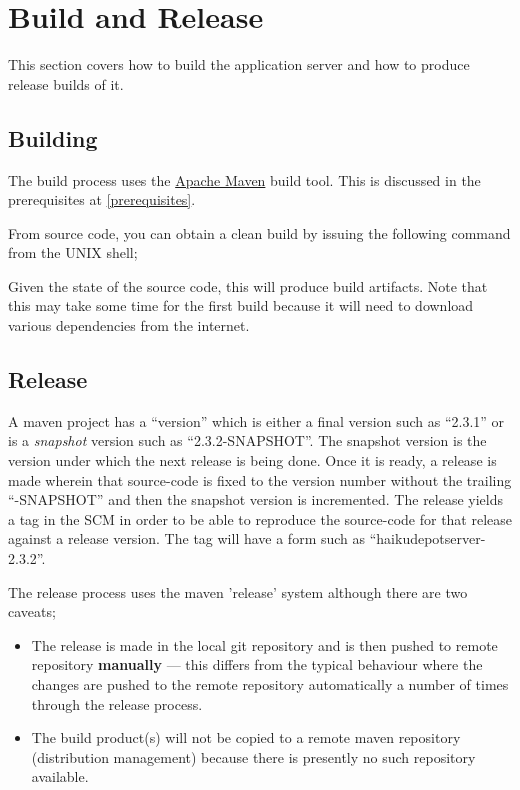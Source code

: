 
\section{Build and Release}
\label{buildandrelease}

This section covers how to build the application server and how to produce release builds of it.

\subsection{Building}

The build process uses the \href{http://maven.apache.org}{Apache Maven} build tool.  This is discussed in the prerequisites at \ref{prerequisites}.

From source code, you can obtain a clean build by issuing the following command from the UNIX shell;


Given the state of the source code, this will produce build artifacts.  Note that this may take some time for the first build because it will need to download various dependencies from the internet.

\subsection{Release}

A maven project has a ``version'' which is either a final version such as ``2.3.1'' or is a {\it snapshot} version such as ``2.3.2-SNAPSHOT''.  The snapshot version is the version under which the next release is being done.  Once it is ready, a release is made wherein that source-code is fixed to the version number without the trailing ``-SNAPSHOT'' and then the snapshot version is incremented.  The release yields a tag in the SCM in order to be able to reproduce the source-code for that release against a release version.  The tag will have a form such as ``haikudepotserver-2.3.2''.

 The release process uses the maven 'release' system although there are two caveats;

 \begin{itemize}
 \item The release is made in the local git repository and is then pushed to remote repository {\bf manually} --- this differs from the typical behaviour where the changes are pushed to the remote repository automatically a number of times through the release process.
 \item The build product(s) will not be copied to a remote maven repository (distribution management) because there is presently no such repository available.
 \end{itemize}

